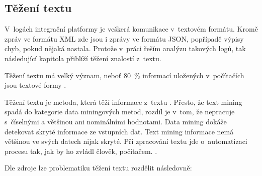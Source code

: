 \documentclass[thesis=M,czech]{FITthesis}[2012/10/20]
\begin{document}
	\subsection{Těžení textu}
		V~logách integrační platformy je veškerá komunikace v~textovém formátu. Kromě zpráv ve formátu XML zde jsou i zprávy ve formátu JSON, popřípadě výpisy chyb, pokud nějaká nastala. Protože v~práci řeším analýzu takových logů, tak následující kapitola přiblíží těžení znalostí z~textu. 
		
		Těžení textu má velký význam, neboť 80~\% informací uložených v~počítačích jsou textové formy \cite{IRWebTechniques}.
		
		Těžení textu je metoda, která těží informace z~textu \cite{WittenTextMining}. Přesto, že text mining spadá do kategorie data miningových metod, rozdíl je v~tom, že nepracuje s~číselnými a většinou ani nominálními hodnotami. Data mining dokáže detekovat skryté informace ze vstupních dat. Text mining informace nemá většinou ve svých datech nijak skryté. Při zpracování textu jde o~automatizaci procesu tak, jak by ho zvládl člověk, počítačem. \cite{WittenTextMining}.
		
		Dle zdroje \cite{textAlg} lze problematiku těžení textu rozdělit následovně:
		
\end{document}
